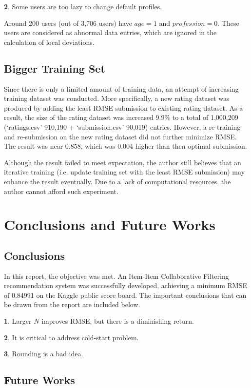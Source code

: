\documentclass{ece}
\begin{document}
\textbf{2}. Some users are too lazy to change default profiles.

Around 200 users (out of 3,706 users) have $age=1$ and $profession=0$.
These users are considered as abnormal data entries, which are ignored in the calculation of local deviations.

\subsection{Bigger Training Set}

Since there is only a limited amount of training data, an attempt of increasing training dataset was conducted.
More specifically, a new rating dataset was produced by adding the least RMSE submission to existing rating dataset.
As a result, the size of the rating dataset was increased 9.9\% to a total of 1,000,209 (`ratings.csv' 910,190 + `submission.csv' 90,019) entries.
However, a re-training and re-submission on the new rating dataset did not further minimize RMSE. The result was near 0.858, which was 0.004 higher than then optimal submission.

Although the result failed to meet expectation, the author still believes that an iterative training (i.e. update training set with the least RMSE submission) may enhance the result eventually.
Due to a lack of computational resources, the author cannot afford such experiment.

\newpage
\section{Conclusions and Future Works}

\subsection{Conclusions}

In this report, the objective was met.
An Item-Item Collaborative Filtering recommendation system was successfully developed, achieving a minimum RMSE of 0.84991 on the Kaggle public score board.
The important conclusions that can be drawn from the report are included below.

\textbf{1}. Larger $N$ improves RMSE, but there is a diminishing return.

\textbf{2}. It is critical to address cold-start problem.

\textbf{3}. Rounding is a bad idea.

\subsection{Future Works}
\end{document}

